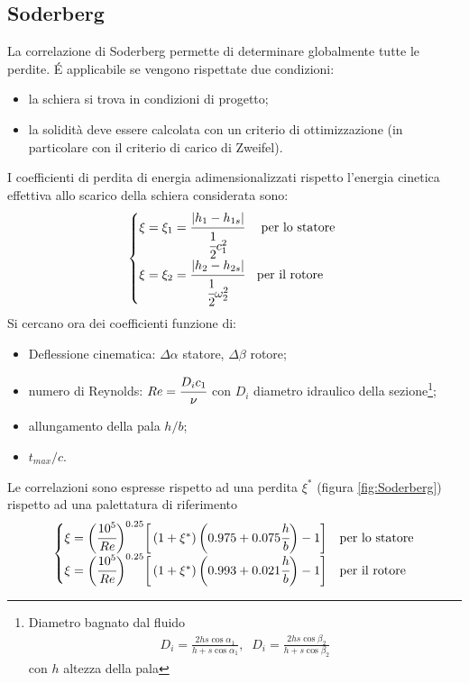 \subsection{Soderberg}
La correlazione di Soderberg permette di determinare globalmente tutte le perdite. \'E applicabile se vengono rispettate due condizioni:
\begin{itemize}
	\item la schiera si trova in condizioni di progetto;
	\item la solidità deve essere calcolata con un criterio di ottimizzazione (in particolare con il criterio di carico di Zweifel).
\end{itemize}
I coefficienti di perdita di energia adimensionalizzati rispetto l'energia cinetica effettiva allo scarico della schiera considerata sono:
\begin{align*}
\begin{cases}
\xi = \xi_1 = \cfrac{|h_1 - h_{1s}|}{\cfrac{1}{2} c_1^2} & \mbox{ per lo statore }\\
\xi = \xi_2 = \cfrac{|h_2 - h_{2s}|}{\cfrac{1}{2} \omega_2^2} & \mbox{per il rotore }
\end{cases}
\end{align*}
Si cercano ora dei coefficienti funzione di:
\begin{itemize}
\item Deflessione cinematica: $\Delta \alpha$ statore, $\Delta \beta$ rotore;
\item numero di Reynolds: $Re = \cfrac{D_i c_1}{\nu}$
con $D_i$ diametro idraulico della sezione\footnote{Diametro bagnato dal fluido \begin{align*}
D_i = \frac{2 h s \cos \alpha_1}{h + s \cos \alpha_1}, \;\; D_i = \frac{2 h s \cos \beta_2}{h + s \cos \beta_2}
\end{align*} con $h$ altezza della pala};

\item allungamento della pala $h/b$;
\item $t_{max}/c$.
\end{itemize}
Le correlazioni sono espresse rispetto ad una perdita $\xi^*$ (figura \ref{fig:Soderberg}) rispetto ad una palettatura di riferimento
\begin{align*}
\begin{cases}
\xi = \bigg( \cfrac{10^5}{Re} \bigg)^{0.25} \bigg[ \left( 1 + \xi^* \right) \bigg ( 0.975 + 0.075 \cfrac{h}{b} \bigg) -1 \bigg] & \mbox{per lo statore} \\
\xi = \bigg( \cfrac{10^5}{Re} \bigg)^{0.25} \bigg[ \left( 1 + \xi^* \right) \bigg ( 0.993 + 0.021 \cfrac{h}{b} \bigg) -1 \bigg] & \mbox{per il rotore}
\end{cases}
\end{align*}
